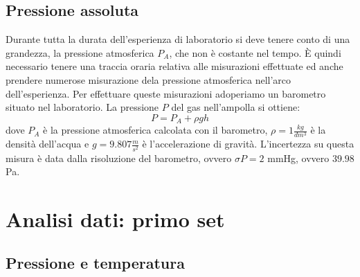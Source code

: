 \subsection{Pressione assoluta}
Durante tutta la durata dell'esperienza di laboratorio si deve tenere conto di una grandezza, la pressione atmosferica $P_A$, che non è costante nel tempo.
È quindi necessario tenere una traccia oraria relativa alle misurazioni effettuate ed anche prendere numerose misurazione dela pressione atmosferica nell'arco dell'esperienza.
Per effettuare queste misurazioni adoperiamo un barometro situato nel laboratorio.
La pressione $P$ del gas nell'ampolla si ottiene:
\begin{equation}
P = P_A + \rho g h
\end{equation}
dove $P_A$ è la pressione atmosferica calcolata con il barometro, $\rho = 1 \frac{kg}{dm^3}$ è la densità dell'acqua e $g = 9.807 \frac{m}{s^2}$
è l'accelerazione di gravità.
L'incertezza su questa misura è data dalla risoluzione del barometro, ovvero $\sigma P = 2$ mmHg, ovvero $39.98$ Pa.

\section{Analisi dati: primo set}
\subsection{Pressione e temperatura}

